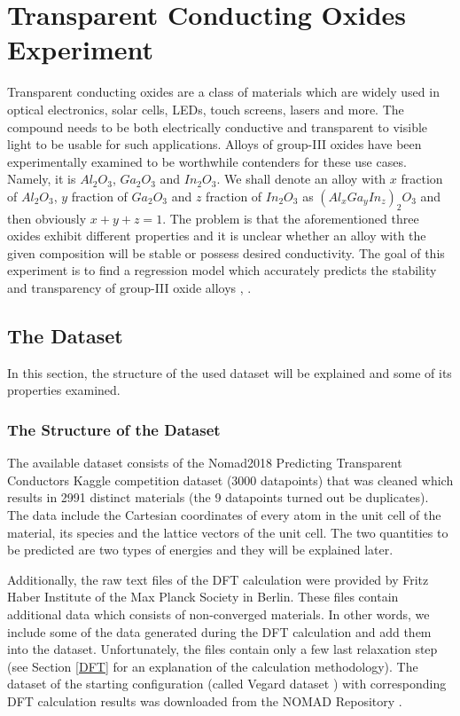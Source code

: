 \documentclass[11pt,oneside,czech,american]{book} %
\theoremstyle{definition} %
\theoremstyle{definition}
\begin{document}
\chapter{Transparent Conducting Oxides Experiment}
Transparent conducting oxides are a class of materials which are widely used in optical electronics, solar cells, LEDs, touch screens, lasers and more. The compound needs to be both electrically conductive and transparent to visible light to be usable for such applications. Alloys of group-III oxides have been experimentally examined to be worthwhile contenders for these use cases. Namely, it is $Al_2 O_3$, $Ga_2 O_3$ and $In_2 O_3$. We shall denote an alloy with $x$ fraction of $Al_2 O_3$, $y$ fraction of $Ga_2 O_3$ and $z$ fraction of $In_2 O_3$ as $(Al_{x}Ga_{y}In_{z})_2 O_3$ and then obviously $x+y+z=1$. The problem is that the aforementioned three oxides exhibit different properties and it is unclear whether an alloy with the given composition will be stable or possess desired conductivity. The goal of this experiment is to find a regression model which accurately predicts the stability and transparency of group-III oxide alloys \parencite{sutton18}, \parencite{sutton19}.

\section{The Dataset}
In this section, the structure of the used dataset will be explained and some of its properties examined.
\subsection{The Structure of the Dataset}
The available dataset consists of the Nomad2018 Predicting Transparent Conductors Kaggle competition dataset (3000 datapoints) that was cleaned which results in 2991 distinct materials (the 9 datapoints turned out be duplicates). The data include the Cartesian coordinates of every atom in the unit cell of the material, its species and the lattice vectors of the unit cell. The two quantities to be predicted are two types of energies and they will be explained later.

Additionally, the raw text files of the DFT calculation were provided by Fritz Haber Institute of the Max Planck Society in Berlin. These files contain additional data which consists of non-converged materials. In other words, we include some of the data generated during the DFT calculation and add them into the dataset. Unfortunately, the files contain only a few last relaxation step (see Section \ref{DFT} for an explanation of the calculation methodology). The dataset of the starting configuration (called Vegard dataset \parencite{NOMAD_repo}) with corresponding DFT calculation results was downloaded from the NOMAD Repository \parencite{NOMAD_repo}.
\end{document}
